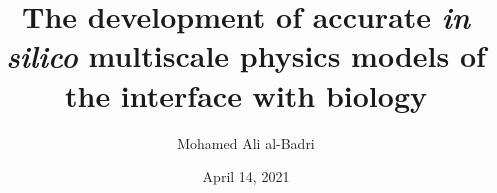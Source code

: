 
\title{
The development of accurate \textit{in silico} multiscale physics models of the interface with biology
}
\author{Mohamed Ali al-Badri}
\date{April 14, 2021}

\maketitle
\makedeclaration

